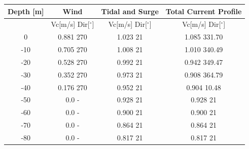 \begin{table} [H]
\centering
\begin{tabular}{ |c|c|c|c|}
\hline
Depth [m] & Wind & Tidal and Surge & Total Current Profile \\
 \hline
 \hline
 & Vc[m/s] \hspace{0.3cm} Dir[$^{\circ}$] &  Vc[m/s] \hspace{0.3cm} Dir[$^{\circ}$] & Vc[m/s] \hspace{0.3cm} Dir[$^{\circ}$] \\
 \hline
 0 & 0.881 \hspace{0.7cm} 270 & 1.023 \hspace{0.7cm} 21  & 1.085 \hspace{0.7cm} 331.70 \\
 -10 & 0.705 \hspace{0.7cm} 270 & 1.008 \hspace{0.7cm} 21  & 1.010 \hspace{0.7cm} 340.49 \\
 -20 & 0.528 \hspace{0.7cm} 270 & 0.992 \hspace{0.7cm} 21  & 0.942
 \hspace{0.7cm} 349.47 \\
 -30 & 0.352 \hspace{0.7cm} 270 & 0.973 \hspace{0.7cm} 21  & 0.908 \hspace{0.7cm} 364.79 \\
 -40 & 0.176 \hspace{0.7cm} 270 & 0.952 \hspace{0.7cm} 21  & 0.904 \hspace{0.7cm} 10.48 \\
 -50 & 0.0 \hspace{0.7cm} - & 0.928 \hspace{0.7cm} 21  & 0.928 \hspace{1.15cm} 21 \\
  -60 & 0.0 \hspace{0.7cm} - & 0.900 \hspace{0.7cm} 21  & 0.900 \hspace{1.15cm} 21 \\
 -70 & 0.0 \hspace{0.7cm} - & 0.864 \hspace{0.7cm} 21  & 0.864 \hspace{1.15cm} 21 \\
  -80 & 0.0 \hspace{0.7cm} - & 0.817 \hspace{0.7cm} 21  & 0.817 \hspace{1.15cm} 21 \\

\end{tabular}
\end{table}
